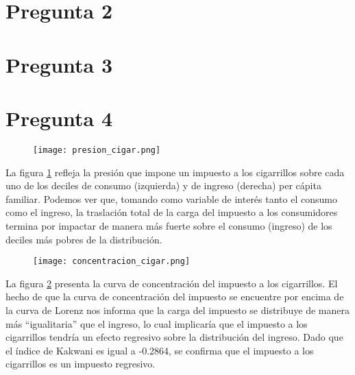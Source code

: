 \documentclass[11pt,oneside]{article}
\begin{document}
	\section*{Pregunta 2}
	
	
	\section*{Pregunta 3}
	
	
 	\section*{Pregunta 4}

	\begin{figure}
    		\centering
    		\texttt{[image: presion\_cigar.png]}
    		\label{fig:4A}
	\end{figure}

	La figura \ref{fig:4A} refleja la presión que impone un impuesto a los cigarrillos sobre cada uno de los deciles de consumo (izquierda) y de ingreso (derecha) per cápita familiar. Podemos ver que, tomando como variable de interés tanto el consumo como el ingreso, la traslación total de la carga del impuesto a los consumidores termina por impactar de manera más fuerte sobre el consumo (ingreso) de los deciles más pobres de la distribución. 

	\begin{figure}
    		\centering
    		\texttt{[image: concentracion\_cigar.png]}
    		\label{fig:4B}
	\end{figure}

	La figura \ref{fig:4B} presenta la curva de concentración del impuesto a los cigarrillos. El hecho de que la curva de concentración del impuesto se encuentre por encima de la curva de Lorenz nos informa que la carga del impuesto se distribuye de manera más ``igualitaria'' que el ingreso, lo cual implicaría que el impuesto a los cigarrillos tendría un efecto regresivo sobre la distribución del ingreso. Dado que el índice de Kakwani es igual a -0.2864, se confirma que el impuesto a los cigarrillos es un impuesto regresivo.
 
\end{document}
